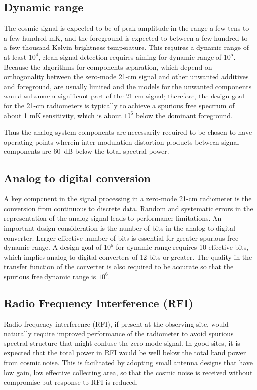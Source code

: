 \subsection{Dynamic range}
  
  The cosmic signal is expected to be of peak amplitude in the range a few tens to a few hundred mK, and the foreground is expected to between a few hundred to a few thousand Kelvin brightness temperature.  This requires a dynamic range of at least $10^4$, clean signal detection requires aiming for dynamic range of $10^5$.  Because the algorithms for components separation, which depend on orthogonality between the zero-mode 21-cm signal and other unwanted additives and foreground, are usually limited and the models for the unwanted components would subsume a significant part of the 21-cm signal; therefore, the design goal for the 21-cm radiometers is typically to achieve a spurious free spectrum of about 1 mK sensitivity, which is about $10^6$ below the dominant foreground.
  
  Thus the analog system components are necessarily required to be chosen to have operating points wherein inter-modulation distortion products between signal components are 60~dB below the total spectral power.
  
\subsection{Analog to digital conversion}
 
 A key component in the signal processing in a zero-mode 21-cm radiometer is the conversion from continuous to discrete data.  Random and systematic errors in the representation of the analog signal leads to performance limitations.  An important design consideration is the number of bits in the analog to digital converter.  Larger effective number of bits is essential for greater spurious free dynamic range.  A design goal of $10^6$ for dynamic range requires 10 effective bits, which implies analog to digital converters of 12 bits or greater.  The quality in the transfer function of the converter is also required to be accurate so that the spurious free dynamic range is $10^6$.
 

\subsection{Radio Frequency Interference (RFI)}
  
  Radio frequency interference (RFI), if present at the observing site, would naturally require improved performance of the radiometer to avoid spurious spectral structure that might confuse the zero-mode signal.  In good sites, it is expected that the total power in RFI would be well below the total band power from cosmic noise.  This is facilitated by adopting small antenna designs that have low gain, low effective collecting area, so that the cosmic noise is received without compromise but response to RFI is reduced. 
 
